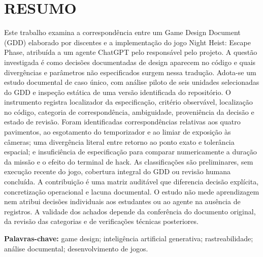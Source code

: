 \section*{RESUMO}
\begin{resumotexto}
Este trabalho examina a correspondência entre um Game Design Document (GDD) elaborado por discentes e a implementação do jogo Night Heist: Escape Phase, atribuída a um agente ChatGPT pelo responsável pelo projeto. A questão investigada é como decisões documentadas de design aparecem no código e quais divergências e parâmetros não especificados surgem nessa tradução. Adota-se um estudo documental de caso único, com análise piloto de seis unidades selecionadas do GDD e inspeção estática de uma versão identificada do repositório. O instrumento registra localizador da especificação, critério observável, localização no código, categoria de correspondência, ambiguidade, proveniência da decisão e estado de revisão. Foram identificadas correspondências relativas aos quatro pavimentos, ao esgotamento do temporizador e ao limiar de exposição às câmeras; uma divergência literal entre retorno ao ponto exato e tolerância espacial; e insuficiência de especificação para comparar numericamente a duração da missão e o efeito do terminal de hack. As classificações são preliminares, sem execução recente do jogo, cobertura integral do GDD ou revisão humana concluída. A contribuição é uma matriz auditável que diferencia decisão explícita, concretização operacional e lacuna documental. O estudo não mede aprendizagem nem atribui decisões individuais aos estudantes ou ao agente na ausência de registros. A validade dos achados depende da conferência do documento original, da revisão das categorias e de verificações técnicas posteriores.

\end{resumotexto}
\noindent\textbf{Palavras-chave:} game design; inteligência artificial generativa; rastreabilidade; análise documental; desenvolvimento de jogos.

